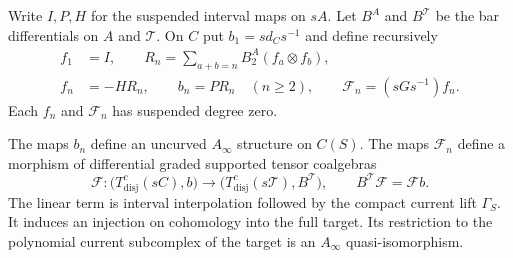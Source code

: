 Write $I,P,H$ for the suspended interval maps on $sA$.
Let $B^A$ and $B^{\mathcal T}$ be the bar differentials on $A$ and
$\mathcal T$.  On $C$ put $b_1=s d_C s^{-1}$ and define recursively
\[
 \begin{split}
 f_1&=I,\qquad
 R_n=\sum_{a+b=n}B^A_2(f_a\otimes f_b),\\
 f_n&=-HR_n,\qquad b_n=PR_n\quad(n\ge2),\qquad
 \mathcal F_n=(sG s^{-1})f_n.
 \end{split}
\]
Each $f_n$ and $\mathcal F_n$ has suspended degree zero.

\begin{theorem}
\label{thm:ordered-current-taylor}
The maps $b_n$ define an uncurved $A_\infty$ structure on $C(S)$.
The maps $\mathcal F_n$ define a morphism of differential graded
supported tensor coalgebras
\[
 \mathcal F:\bigl(T^c_{\mathrm{disj}}(sC),b\bigr)
       \longrightarrow
       \bigl(T^c_{\mathrm{disj}}(s\mathcal T),B^{\mathcal T}\bigr),
 \qquad B^{\mathcal T}\mathcal F=\mathcal F b.
\]
The linear term is interval interpolation followed by the compact
current lift $\Gamma_S$.  It induces an injection on cohomology
into the full target.  Its restriction to the polynomial current
subcomplex of the target is an $A_\infty$ quasi-isomorphism.
\end{theorem}
